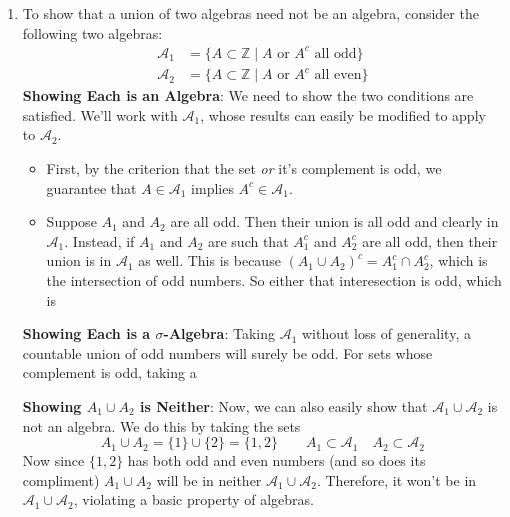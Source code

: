 \documentclass[12pt]{article}
\theoremstyle{plain}
\theoremstyle{definition}
\theoremstyle{remark}
\begin{document}
\begin{enumerate}
\begin{enumerate}
\item
To show that a union of two algebras need not be an algebra, consider the following two algebras:
\begin{align*}
\mathscr{A}_1 &= \{ A \subset \mathbb{Z} \; | \;
A \text{ or } A^c \text{ all odd} \} \\
\mathscr{A}_2 &= \{ A \subset \mathbb{Z} \; | \;
A \text{ or } A^c \text{ all even} \}
\end{align*}
\textbf{Showing Each is an Algebra}: We need to show the two conditions are satisfied. We'll work with $\mathscr{A}_1$, whose results can easily be modified to apply to $\mathscr{A}_2$.
\begin{itemize}
    \item First, by the criterion that the set \emph{or} it's complement is odd, we guarantee that $A\in\mathscr{A}_1$ implies $A^c\in\mathscr{A}_1$.

    \item Suppose $A_1$ and $A_2$ are all odd. Then their union is all odd and clearly in $\mathscr{A}_1$. Instead, if $A_1$ and $A_2$ are such that $A_1^c$ and $A_2^c$ are all odd, then their union is in $\mathscr{A}_1$ as well. This is because $(A_1 \cup A_2)^c = A_1^c \cap A_2^c$, which is the intersection of odd numbers. So either that interesection is odd, which is 
\end{itemize}

\textbf{Showing Each is a $\sigma$-Algebra}: Taking $\mathscr{A}_1$ without loss of generality, a countable union of odd numbers will surely be odd. For sets whose complement is odd, taking a 

\textbf{Showing $A_1\cup A_2$ is Neither}: Now, we can also easily show that $\mathscr{A}_1 \cup \mathscr{A}_2$ is not an algebra. We do this by taking the sets
\[
A_1 \cup A_2 = \{1\} \cup \{2\} = \{1,2\}
\qquad A_1 \subset \mathscr{A}_1
\quad A_2 \subset \mathscr{A}_2
\]
Now since $\{1,2\}$ has both odd and even numbers (and so does its compliment) $A_1 \cup A_2$ will be in neither $\mathscr{A}_1 \cup \mathscr{A}_2$. Therefore, it won't be in $\mathscr{A}_1 \cup \mathscr{A}_2$, violating a basic property of algebras.
\end{enumerate}



\end{enumerate}
\end{document}
